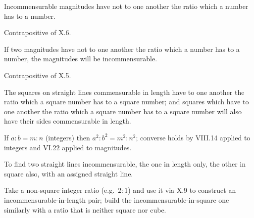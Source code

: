 \documentclass{rrxiv}
\begin{document}
\begin{claim}
\label{prop:X.7}
Incommensurable magnitudes have not to one another the ratio which
a number has to a number.
\end{claim}
\begin{evidence}[Proof of X.7]
\label{ev:X.7}
Contrapositive of X.6.
\end{evidence}

\begin{claim}
\label{prop:X.8}
If two magnitudes have not to one another the ratio which a number
has to a number, the magnitudes will be incommensurable.
\end{claim}
\begin{evidence}[Proof of X.8]
\label{ev:X.8}
Contrapositive of X.5.
\end{evidence}

\begin{claim}
\label{prop:X.9}
The squares on straight lines commensurable in length have to one
another the ratio which a square number has to a square number; and
squares which have to one another the ratio which a square number
has to a square number will also have their sides commensurable in
length.
\end{claim}
\begin{evidence}[Proof of X.9]
\label{ev:X.9}
If $a : b = m : n$ (integers) then $a^2 : b^2 = m^2 : n^2$; converse
holds by VIII.14 applied to integers and VI.22 applied to magnitudes.
\end{evidence}

\begin{claim}
\label{prop:X.10}
To find two straight lines incommensurable, the one in length only,
the other in square also, with an assigned straight line.
\end{claim}
\begin{evidence}[Proof of X.10]
\label{ev:X.10}
Take a non-square integer ratio (e.g.\ $2 : 1$) and use it via X.9 to
construct an incommensurable-in-length pair; build the
incommensurable-in-square one similarly with a ratio that is neither
square nor cube.
\end{evidence}
\end{document}
